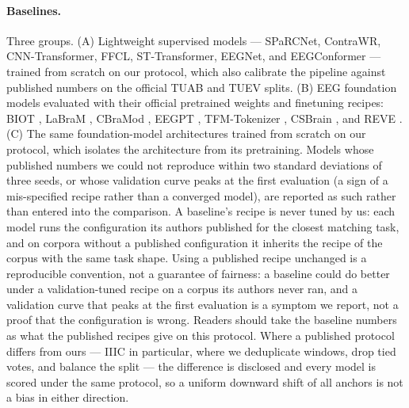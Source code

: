 \paragraph{Baselines.}
Three groups. (A) Lightweight supervised models --- SPaRCNet, ContraWR,
CNN-Transformer, FFCL, ST-Transformer, EEGNet, and EEGConformer --- trained
from scratch on our protocol, which also calibrate the pipeline against
published numbers on the official TUAB and TUEV splits. (B) EEG foundation
models evaluated with their official pretrained weights and finetuning
recipes: BIOT \citep{yang2023biot}, LaBraM \citep{jiang2024labram}, CBraMod
\citep{wang2025cbramod}, EEGPT \citep{wang2024eegpt}, TFM-Tokenizer
\citep{pradeepkumar2026tfm}, CSBrain \citep{zhou2025csbrain}, and REVE
\citep{bertrand2025reve}. (C) The same foundation-model architectures
trained from scratch on our protocol, which isolates the architecture from
its pretraining. Models whose published numbers we could not reproduce
within two standard deviations of three seeds, or whose validation curve
peaks at the first evaluation (a sign of a mis-specified recipe rather than
a converged model), are reported as such rather than entered into the
comparison. A baseline's recipe is never tuned by us: each model runs the
configuration its authors published for the closest matching task, and on
corpora without a published configuration it inherits the recipe of the
corpus with the same task shape. Using a published recipe unchanged is a
reproducible convention, not a guarantee of fairness: a baseline could do
better under a validation-tuned recipe on a corpus its authors never ran,
and a validation curve that peaks at the first evaluation is a symptom we
report, not a proof that the configuration is wrong. Readers should take
the baseline numbers as what the published recipes give on this
protocol. Where a published protocol differs from
ours --- IIIC in particular, where we deduplicate windows, drop tied votes,
and balance the split --- the difference is disclosed and every model is
scored under the same protocol, so a uniform downward shift of all anchors
is not a bias in either direction.

